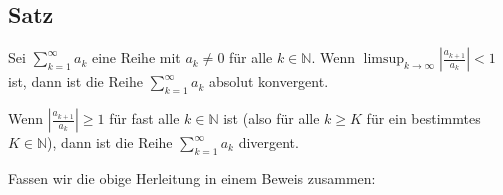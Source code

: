 \documentclass[fontsize=9pt,
               parskip=half-,
               DIV=14,
               listof=chapterentry,
               tocflat]{scrbook}
\begin{document}
\subsection{Satz}

\begin{theorem*}
Sei $\sum _{k=1}^{\infty }a_{k}$ eine Reihe mit $a_{k}\neq 0$ für alle $k\in \mathbb {N} $. Wenn $\limsup _{k\to \infty }\left|{\tfrac {a_{k+1}}{a_{k}}}\right|<1$ ist, dann ist die Reihe $\sum _{k=1}^{\infty }a_{k}$ absolut konvergent.

Wenn $\left|{\tfrac {a_{k+1}}{a_{k}}}\right|\geq 1$ für fast alle $k\in \mathbb {N} $ ist (also für alle $k\geq K$ für ein bestimmtes $K\in \mathbb {N} $), dann ist die Reihe $\sum _{k=1}^{\infty }a_{k}$ divergent.

\end{theorem*}

\begin{explanation*}
Fassen wir die obige Herleitung in einem Beweis zusammen:

\end{explanation*}
\end{document}
